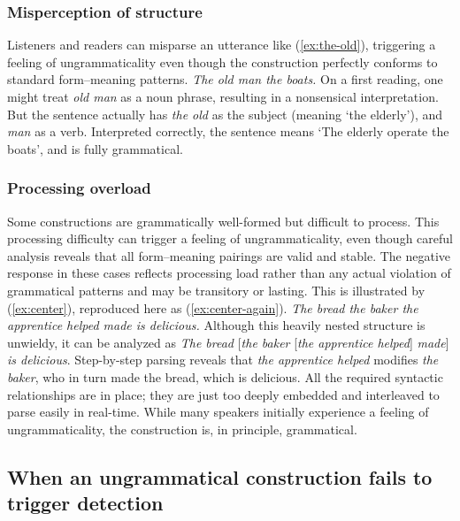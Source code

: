 \subsubsection{Misperception of structure}

Listeners and readers can misparse an utterance like (\ref{ex:the-old}), triggering a feeling of ungrammaticality even though the construction perfectly conforms to standard form--meaning patterns.
\ea
\textit{The old man the boats.} \autocite{ritchie1984}\label{ex:the-old}
\z
On a first reading, one might treat \textit{old man} as a noun phrase, resulting in a nonsensical interpretation. But the sentence actually has \textit{the old} as the subject (meaning `the elderly'), and \textit{man} as a verb. Interpreted correctly, the sentence means `The elderly operate the boats', and is fully grammatical.


\subsubsection{Processing overload}

Some constructions are grammatically well-formed but difficult to process. This processing difficulty can trigger a feeling of ungrammaticality, even though careful analysis reveals that all form--meaning pairings are valid and stable. The negative response in these cases reflects processing load rather than any actual violation of grammatical patterns and may be transitory or lasting. This is illustrated by (\ref{ex:center}), reproduced here as (\ref{ex:center-again}).
\ea
\textit{The bread the baker the apprentice helped made is delicious.}\label{ex:center-again}
\z
Although this heavily nested structure is unwieldy, it can be analyzed as  \textit{The bread} [\textit{the baker} [\textit{the apprentice helped}] \textit{made}] \textit{is delicious}. Step-by-step parsing reveals that \textit{the apprentice helped} modifies \textit{the baker}, who in turn made the bread, which is delicious. All the required syntactic relationships are in place; they are just too deeply embedded and interleaved to parse easily in real-time. While many speakers initially experience a feeling of ungrammaticality, the construction is, in principle, grammatical.

\subsection{When an ungrammatical construction fails to trigger detection}\label{sec:wrongly-grammatical}

